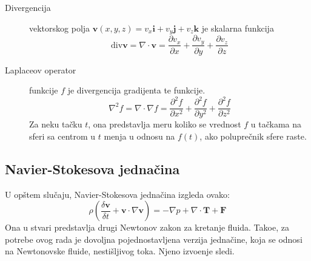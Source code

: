 \documentclass[12pt]{article}
\renewcommand{\vec}[1]{\mathbf{#1}}
\begin{document}
\begin{description}
          \item[Divergencija] vektorskog polja $\vec{v}(x, y, z)=v_x\vec{i}+v_y\vec{j}+v_z\vec{k}$ je skalarna funkcija
                \begin{equation}\label{eq:definicija divergencije}
                \text{div} \vec{v} = \nabla \cdot \vec{v} = \frac{\partial v_x}{\partial x} + \frac{\partial v_y}{\partial y} + \frac{\partial v_z}{\partial z}
                \end{equation}
          \item[Laplaceov operator] funkcije $f$ je divergencija gradijenta te funkcije.
          \begin{equation}\label{eq:definicija laplaceovog operatora}
          \nabla^2 f = \nabla\cdot\nabla f = \frac{\partial^2 f}{\partial x^2} + \frac{\partial^2 f}{\partial y^2} + \frac{\partial^2 f}{\partial z^2}
          \end{equation}
              Za neku ta\v cku $t$, ona predstavlja meru koliko se vrednost $f$ u ta\v ckama na sferi sa centrom u $t$ menja u odnosu na $f(t)$, ako polupre\v cnik sfere raste.
        \end{description}
    \subsection{Navier-Stokesova jedna\v cina} \label{Navier Stokes}
        U op\v stem slu\v caju, Navier-Stokesova jedna\v cina izgleda ovako:
        \begin{equation}\label{eq:Navier-Stokes opsti slucaj}
            \rho(\frac{\delta \vec{v}}{\delta t} + \vec{v} \cdot \nabla \vec{v}) = -\nabla p + \nabla \cdot \vec{T} + \vec{F}
        \end{equation}
        Ona u stvari predstavlja drugi Newtonov zakon za kretanje fluida. Tako\dj e, za potrebe ovog rada je dovoljna pojednostavljena verzija jedna\v cine, koja se odnosi na Newtonovske fluide, nesti\v sljivog toka. Njeno izvo\dj enje sledi.
\end{document}
